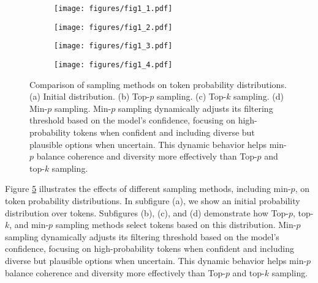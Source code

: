 \documentclass{article}
\begin{document}
\begin{figure}[t]
    \centering
    \begin{subfigure}[b]{0.48\textwidth}
        \centering
        \texttt{[image: figures/fig1\_1.pdf]}
        \caption{}
        \label{fig:subfig1}
    \end{subfigure}
    \hfill
    \begin{subfigure}[b]{0.48\textwidth}
        \centering
        \texttt{[image: figures/fig1\_2.pdf]}
        \caption{}
        \label{fig:subfig2}
    \end{subfigure}
    
    \vspace{1em}
    
    \begin{subfigure}[b]{0.48\textwidth}
        \centering
        \texttt{[image: figures/fig1\_3.pdf]}
        \caption{}
        \label{fig:subfig3}
    \end{subfigure}
    \hfill
    \begin{subfigure}[b]{0.48\textwidth}
        \centering
        \texttt{[image: figures/fig1\_4.pdf]}
        \caption{}
        \label{fig:subfig4}
    \end{subfigure}
    
   \caption{Comparison of sampling methods on token probability distributions. (a) Initial distribution. (b) Top-\(p\) sampling. (c) Top-$k$ sampling. (d) Min-\( p \) sampling. Min-\( p \) sampling dynamically adjusts its filtering threshold based on the model's confidence, focusing on high-probability tokens when confident and including diverse but plausible options when uncertain. This dynamic behavior helps min-\( p \) balance coherence and diversity more effectively than Top-\(p\) and top-$k$ sampling.}

    \label{fig:sampling}
\end{figure}

Figure \ref{fig:sampling} illustrates the effects of different sampling methods, including min-\( p \), on token probability distributions. In subfigure (a), we show an initial probability distribution over tokens. Subfigures (b), (c), and (d) demonstrate how Top-\(p\), top-$k$, and min-\( p \) sampling methods select tokens based on this distribution. Min-\( p \) sampling dynamically adjusts its filtering threshold based on the model's confidence, focusing on high-probability tokens when confident and including diverse but plausible options when uncertain. This dynamic behavior helps min-\( p \) balance coherence and diversity more effectively than Top-\(p\) and top-$k$ sampling.
\end{document}
